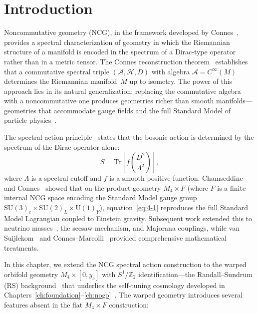 \section{Introduction}
\label{sec:4-intro}

Noncommutative geometry (NCG), in the framework developed by Connes~\cite{ch4:Connes1994}, provides a spectral characterization of geometry in which the Riemannian structure of a manifold is encoded in the spectrum of a Dirac-type operator rather than in a metric tensor. The Connes reconstruction theorem~\cite{ch4:Connes2013} establishes that a commutative spectral triple $(\mathcal{A}, \mathcal{H}, D)$ with algebra $\mathcal{A} = C^\infty(M)$ determines the Riemannian manifold~$M$ up to isometry. The power of this approach lies in its natural generalization: replacing the commutative algebra with a noncommutative one produces geometries richer than smooth manifolds---geometries that accommodate gauge fields and the full Standard Model of particle physics~\cite{ch4:CC1997,ch4:CC1996}.

The spectral action principle~\cite{ch4:CC1997} states that the bosonic action is determined by the spectrum of the Dirac operator alone:
\begin{equation}
  S = \mathrm{Tr}\!\left[f\!\left(\frac{D^2}{\Lambda^2}\right)\right],
  \label{eq:4-1}
\end{equation}
where $\Lambda$ is a spectral cutoff and $f$ is a smooth positive function. Chamseddine and Connes~\cite{ch4:CC1997} showed that on the product geometry $M_4 \times F$ (where $F$ is a finite internal NCG space encoding the Standard Model gauge group $\mathrm{SU}(3)_c \times \mathrm{SU}(2)_L \times \mathrm{U}(1)_Y$), equation~\eqref{eq:4-1} reproduces the full Standard Model Lagrangian coupled to Einstein gravity. Subsequent work extended this to neutrino masses~\cite{ch4:CCM2007}, the seesaw mechanism, and Majorana couplings, while van Suijlekom~\cite{ch4:vanSuijlekom2015} and Connes--Marcolli~\cite{ch4:ConnesMarcolli2008} provided comprehensive mathematical treatments.

In this chapter, we extend the NCG spectral action construction to the warped orbifold geometry $M_4 \times [0, y_c]$ with $S^1/\mathbb{Z}_2$ identification---the Randall--Sundrum (RS) background~\cite{ch4:RS1999a,ch4:RS1999b} that underlies the self-tuning cosmology developed in Chapters~\ref{ch:foundation}--\ref{ch:nogo}~\cite{ch4:PaperI,ch4:PaperII,ch4:PaperIII}. The warped geometry introduces several features absent in the flat $M_4 \times F$ construction:


